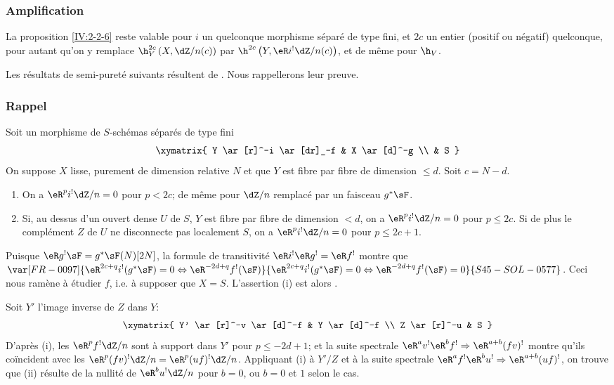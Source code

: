 \subsubsection{Amplification}\label{IV:2-2-7}

La proposition \ref{IV:2-2-6} reste valable pour $i$ un quelconque morphisme 
séparé de type fini, et $2 c$ un entier (positif ou négatif) quelconque, 
pour autant qu'on y remplace $\h_Y^{2 c}\left(X,\dZ/n(c)\right)$ par 
$\h^{2 c}\left(Y,\eR i^!\dZ/n(c)\right)$, et de même pour $\h_V$. 

Les résultats de semi-pureté suivants résultent de 
. Nous rappellerons leur preuve. 





\subsubsection{Rappel}\label{IV:2-2-8}
Soit un morphisme de $S$-schémas séparés de type fini 
\[\xymatrix{
  Y \ar[r]^-i \ar[dr]_-f 
    & X \ar[d]^-g \\
  & S
}\]
On suppose $X$ lisse, purement de dimension relative $N$ et que $Y$ est fibre 
par fibre de dimension $\leqslant d$. Soit $c=N-d$. 
\begin{enumerate}[\indent (i)]
  \item On a $\eR^p i^!\dZ/n=0$ pour $p<2 c$; de même pour $\dZ/n$ remplacé 
    par un faisceau $g^* \sF$.
  \item Si, au dessus d'un ouvert dense $U$ de $S$, $Y$ est fibre par fibre de 
    dimension $<d$, on a $\eR^p i^!\dZ/n=0$ pour $p\leqslant 2 c$. Si de plus le 
    complément $Z$ de $U$ ne disconnecte pas localement $S$, on a 
    $\eR^pi^!\dZ/n=0$ pour $p\leqslant 2 c+1$.
\end{enumerate}

Puisque $\eR g^! \sF=g^*\sF(N)[2N]$, la formule de transitivité 
$\eR i^!\eR g^!=\eR f^!$ montre que 
$\var[FR-0097]{\eR^{2 c+q} i^!(g^*\sF)=0\Leftrightarrow \eR^{-2 d+q}f^!(\sF)}{\eR^{2 c+q} i^!(g^*\sF)=0\Leftrightarrow \eR^{-2 d+q}f^!(\sF)=0}{S45-SOL-0577}$. Ceci nous 
ramène à étudier $f$, i.e. à supposer que $X=S$. L'assertion (i) est 
alors . 

Soit $Y'$ l'image inverse de $Z$ dans $Y$:
\[\xymatrix{
  Y' \ar[r]^-v \ar[d]^-f 
    & Y \ar[d]^-f \\
  Z \ar[r]^-u 
    & S
}\]
D'après (i), les $\eR^p f^! \dZ/n$ sont à support dans $Y'$ pour 
$p\leqslant -2 d+1$; et la suite spectrale 
$\eR^a v^!\eR^b f^! \Rightarrow \eR^{a+b} (f v)^!$ montre qu'ils coïncident avec 
les $\eR^p(f v)^!\dZ/n=\eR^p(u f)^!\dZ/n$. Appliquant (i) à $Y'/Z$ et à la 
suite spectrale $\eR^a f^!\eR^b u^! \Rightarrow \eR^{a+b} (u f)^!$, on trouve que 
(ii) résulte de la nullité de $\eR^b u^! \dZ/n$ pour $b=0$, ou $b=0$ et $1$ 
selon le cas. 





